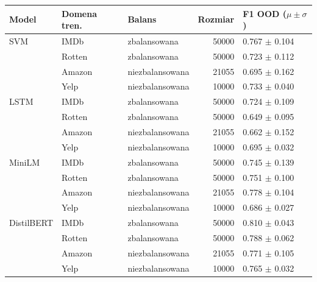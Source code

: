 \begin{tabularx}{\textwidth}{@{}lllrY@{}}
\hline
Model & Domena tren. & Balans & Rozmiar & F1 OOD ($\mu\pm\sigma$) \\
\hline
SVM & IMDb & zbalansowana & 50000 & 0.767 $\pm$ 0.104 \\
 & Rotten & zbalansowana & 50000 & 0.723 $\pm$ 0.112 \\
 & Amazon & niezbalansowana & 21055 & 0.695 $\pm$ 0.162 \\
 & Yelp & niezbalansowana & 10000 & 0.733 $\pm$ 0.040 \\
LSTM & IMDb & zbalansowana & 50000 & 0.724 $\pm$ 0.109 \\
 & Rotten & zbalansowana & 50000 & 0.649 $\pm$ 0.095 \\
 & Amazon & niezbalansowana & 21055 & 0.662 $\pm$ 0.152 \\
 & Yelp & niezbalansowana & 10000 & 0.695 $\pm$ 0.032 \\
MiniLM & IMDb & zbalansowana & 50000 & 0.745 $\pm$ 0.139 \\
 & Rotten & zbalansowana & 50000 & 0.751 $\pm$ 0.100 \\
 & Amazon & niezbalansowana & 21055 & 0.778 $\pm$ 0.104 \\
 & Yelp & niezbalansowana & 10000 & 0.686 $\pm$ 0.027 \\
DistilBERT & IMDb & zbalansowana & 50000 & 0.810 $\pm$ 0.043 \\
 & Rotten & zbalansowana & 50000 & 0.788 $\pm$ 0.062 \\
 & Amazon & niezbalansowana & 21055 & 0.771 $\pm$ 0.105 \\
 & Yelp & niezbalansowana & 10000 & 0.765 $\pm$ 0.032 \\
\hline
\end{tabularx}
